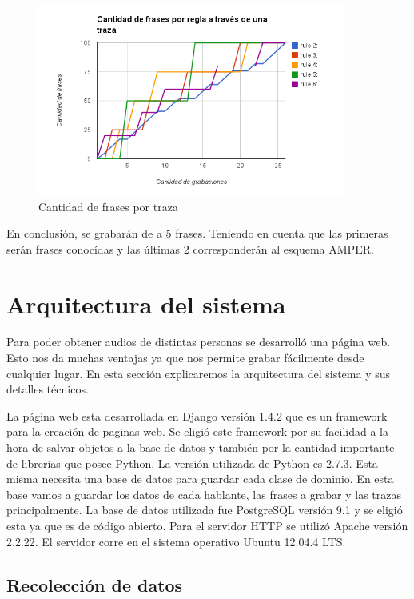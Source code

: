 \documentclass[11pt,a4paper,twoside]{tesis}
\begin{document}

\begin{figure}[h!]
    \centerline{\includegraphics[width=0.9\textwidth]{cant_frases_traza_inf} }
    \caption{Cantidad de frases por traza}
    \label{figFracesTraza}
\end{figure}

En conclusión, se grabarán de a 5 frases. Teniendo en cuenta que las primeras serán frases conocídas y las últimas 2 corresponderán al esquema AMPER. 

\chapter{Arquitectura del sistema}

Para poder obtener audios de distintas personas se desarrolló una página web. Esto nos da muchas ventajas ya que nos permite grabar fácilmente desde cualquier lugar. En esta sección explicaremos la arquitectura del sistema y sus detalles técnicos.

La página web esta desarrollada en Django versión 1.4.2 que es un framework para la creación de paginas web. Se eligió este framework por su facilidad a la hora de salvar objetos a la base de datos y también por la cantidad importante de librerías que posee Python. La versión utilizada de Python es 2.7.3. Esta misma necesita una base de datos para guardar cada clase de dominio. En esta base vamos a guardar los datos de cada hablante, las frases a grabar y las trazas principalmente. La base de datos utilizada fue PostgreSQL versión 9.1 y se eligió esta ya que es de código abierto. Para el servidor HTTP se utilizó Apache versión 2.2.22. El servidor corre en el sistema operativo Ubuntu 12.04.4 LTS.

\section{Recolección de datos}
\end{document}
